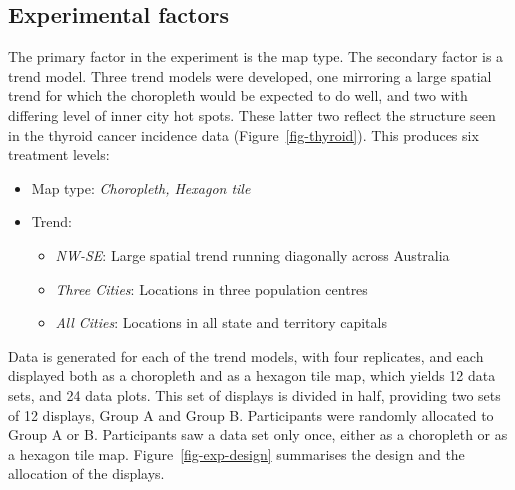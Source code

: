 \documentclass[
doublespace,
  times]{anzsauth}
\providecommand{\tightlist}{%
  \setlength{\itemsep}{0pt}\setlength{\parskip}{0pt}}
\begin{document}
\subsection{Experimental factors}\label{experimental-factors}

The primary factor in the experiment is the map type. The secondary
factor is a trend model. Three trend models were developed, one
mirroring a large spatial trend for which the choropleth would be
expected to do well, and two with differing level of inner city hot
spots. These latter two reflect the structure seen in the thyroid cancer
incidence data (Figure~\ref{fig-thyroid}). This produces six treatment
levels:

\begin{itemize}
\item
  Map type: \emph{Choropleth, Hexagon tile}
\item
  Trend:

  \begin{itemize}
  \tightlist
  \item
    \emph{NW-SE}: Large spatial trend running diagonally across
    Australia
  \item
    \emph{Three Cities}: Locations in three population centres
  \item
    \emph{All Cities}: Locations in all state and territory capitals
  \end{itemize}
\end{itemize}

Data is generated for each of the trend models, with four replicates,
and each displayed both as a choropleth and as a hexagon tile map, which
yields 12 data sets, and 24 data plots. This set of displays is divided
in half, providing two sets of 12 displays, Group A and Group B.
Participants were randomly allocated to Group A or B. Participants saw a
data set only once, either as a choropleth or as a hexagon tile map.
Figure~\ref{fig-exp-design} summarises the design and the allocation of
the displays.
\end{document}
